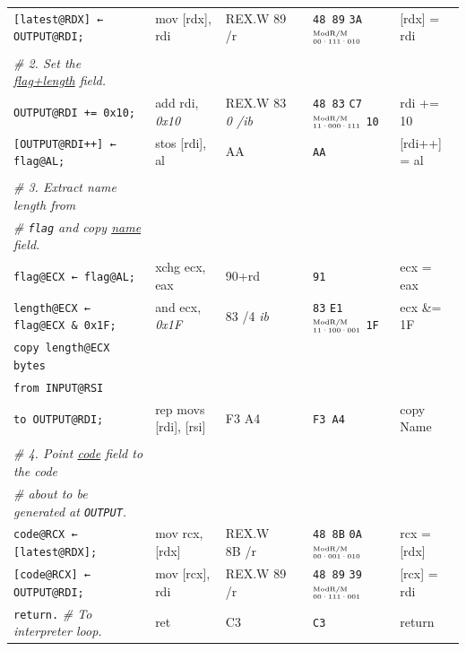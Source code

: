 \documentclass[a4paper,12pt,final]{article}
\begin{document}
\begin{table}[!htbp]
\begin{adjustwidth}{-1cm}{-1cm}
\begin{center}
\begin{tabular}{l|ll|l|lH}
\texttt{[latest@RDX] ← OUTPUT@RDI;} & mov [rdx], rdi & REX.W 89 /r &  & \texttt{48 89} \texttt{3A}​\(^{\text{\tiny ModR/M}}_{\text{\tiny 00·111·010}}\) & [rdx] = rdi\\[0pt]
 &  &  &  &  & \\[0pt]
\emph{\# 2. Set the \uline{flag+length} field.} &  &  &  &  & \\[0pt]
\texttt{OUTPUT@RDI += 0x10;} & add rdi, \emph{0x10} & REX.W 83 \emph{0 /ib} &  & \texttt{48 83} \texttt{C7}​\(^{\text{\tiny ModR/M}}_{\text{\tiny 11·000·111}}\) \texttt{10} & rdi += 10\\[0pt]
\texttt{[OUTPUT@RDI++] ← flag@AL;} & stos [rdi], al & AA &  & \texttt{AA} & [rdi++] = al\\[0pt]
 &  &  &  &  & \\[0pt]
\emph{\# 3. Extract name length from} &  &  &  &  & \\[0pt]
\emph{\# \texttt{flag} and copy \uline{name} field.} &  &  &  &  & \\[0pt]
\texttt{flag@ECX ← flag@AL;} & xchg ecx, eax & 90+rd &  & \texttt{91} & ecx = eax\\[0pt]
\texttt{length@ECX ← flag@ECX \& 0x1F;} & and ecx, \emph{0x1F} & 83 /​4 \emph{ib} &  & \texttt{83} \texttt{E1}​\(^{\text{\tiny ModR/M}}_{\text{\tiny 11·100·001}}\) \texttt{1F} & ecx \&= 1F\\[0pt]
\texttt{copy      length@ECX bytes} &  &  &  &  & \\[0pt]
\hspace{2.632500em}​\texttt{from INPUT@RSI} &  &  &  &  & \\[0pt]
\hspace{2.632500em}​\texttt{to OUTPUT@RDI;} & rep movs [rdi], [rsi] & F3 A4 &  & \texttt{F3 A4} & copy Name\\[0pt]
 &  &  &  &  & \\[0pt]
\emph{\# 4. Point \uline{code} field to the code} &  &  &  &  & \\[0pt]
\emph{\# about to be generated at \texttt{OUTPUT}.} &  &  &  &  & \\[0pt]
\texttt{code@RCX ← [latest@RDX];} & mov rcx, [rdx] & REX.W 8B /r &  & \texttt{48 8B} \texttt{0A}​\(^{\text{\tiny ModR/M}}_{\text{\tiny 00·001·010}}\) & rcx = [rdx]\\[0pt]
\texttt{[code@RCX] ← OUTPUT@RDI;} & mov [rcx], rdi & REX.W 89 /r &  & \texttt{48 89} \texttt{39}​\(^{\text{\tiny ModR/M}}_{\text{\tiny 00·111·001}}\) & [rcx] = rdi\\[0pt]
\texttt{return.}  \emph{\# To interpreter loop.} & ret & C3 &  & \texttt{C3} & return\\[0pt]
\end{tabular}

\end{center}
\normalsize \end{adjustwidth} \end{table} \vspace{0}
\clearpage
\end{document}
